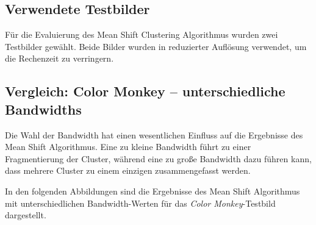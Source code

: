 \subsection*{Verwendete Testbilder}

Für die Evaluierung des Mean Shift Clustering Algorithmus wurden zwei Testbilder gewählt. Beide Bilder wurden in reduzierter Auflösung verwendet, um die Rechenzeit zu verringern.

\begin{minipage}[t]{0.5\textwidth}
\end{minipage}
%
\begin{minipage}[t]{0.5\textwidth}
\end{minipage}


\subsection*{Vergleich: Color Monkey – unterschiedliche Bandwidths}

Die Wahl der Bandwidth hat einen wesentlichen Einfluss auf die Ergebnisse des Mean Shift Algorithmus. Eine zu kleine Bandwidth führt zu einer Fragmentierung der Cluster, während eine zu große Bandwidth dazu führen kann, dass mehrere Cluster zu einem einzigen zusammengefasst werden.

In den folgenden Abbildungen sind die Ergebnisse des Mean Shift Algorithmus mit unterschiedlichen Bandwidth-Werten für das \textit{Color Monkey}-Testbild dargestellt.

\begin{minipage}[t]{0.23\textwidth}
\end{minipage}
%
\begin{minipage}[t]{0.23\textwidth}
\end{minipage}
%
\begin{minipage}[t]{0.23\textwidth}
\end{minipage}
%
\begin{minipage}[t]{0.23\textwidth}
\end{minipage}

